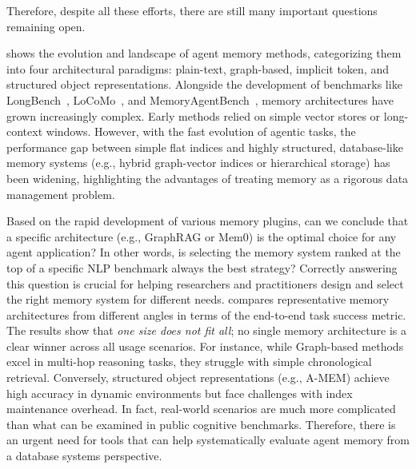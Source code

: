 \iffalse

Therefore, despite all these efforts, there are still many important questions remaining open.


  
 shows the evolution and landscape of agent memory methods, categorizing them into four architectural paradigms: plain-text, graph-based, implicit token, and structured object representations. Alongside the development of benchmarks like LongBench~\cite{bai2023longbench}, LoCoMo~\cite{maharana2024locomo}, and MemoryAgentBench~\cite{memoryagentbench2026}, memory architectures have grown increasingly complex. Early methods relied on simple vector stores or long-context windows. However, with the fast evolution of agentic tasks, the performance gap between simple flat indices and highly structured, database-like memory systems (e.g., hybrid graph-vector indices or hierarchical storage) has been widening, highlighting the advantages of treating memory as a rigorous data management problem.

 Based on the rapid development of various memory plugins, can we conclude that a specific architecture (e.g., GraphRAG or Mem0) is the optimal choice for any agent application? In other words, is selecting the memory system ranked at the top of a specific NLP benchmark always the best strategy? 
Correctly answering this question is crucial for helping researchers and practitioners design and select the right memory system for different needs. 
 compares representative memory architectures from different angles in terms of the end-to-end task success metric. The results show that \textit{one size does not fit all}; no single memory architecture is a clear winner across all usage scenarios. For instance, while Graph-based methods excel in multi-hop reasoning tasks, they struggle with simple chronological retrieval. Conversely, structured object representations (e.g., A-MEM) achieve high accuracy in dynamic environments but face challenges with index maintenance overhead. In fact, real-world scenarios are much more complicated than what can be examined in public cognitive benchmarks. Therefore, there is an urgent need for tools that can help systematically evaluate agent memory from a database systems perspective.

